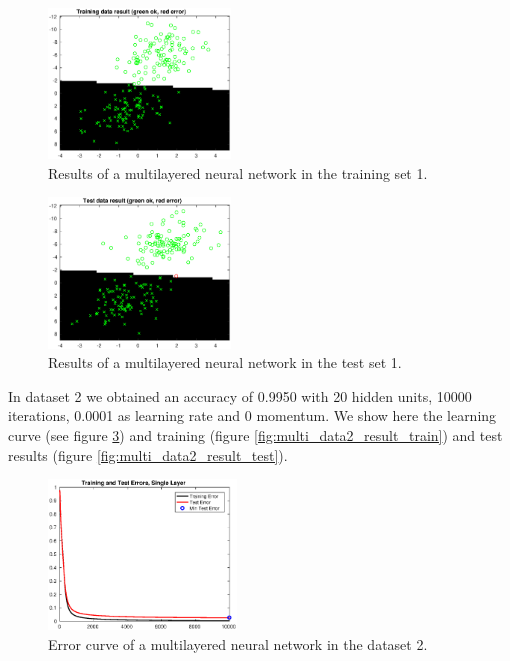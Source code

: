 \documentclass{article}
\begin{document}
\begin{figure}[!htb]
\centering
\includegraphics[height=4cm]{images/multi_data1_result_train}
\caption{Results of a multilayered neural network in the training set 1.}
\label{fig:multi_data1_result_train}
\end{figure}

\begin{figure}[!htb]
\centering
\includegraphics[height=4cm]{images/multi_data1_result_test}
\caption{Results of a multilayered neural network in the test set 1.}
\label{fig:multi_data1_result_test}
\end{figure}


In dataset 2 we obtained an accuracy of 0.9950 with 20 hidden units, 10000 iterations, 0.0001 as learning rate and 0 momentum. We show here the learning curve (see figure \ref{fig:multi_data2_error}) and training (figure \ref{fig:multi_data2_result_train}) and test results (figure \ref{fig:multi_data2_result_test}).

\begin{figure}[!htb]
\centering
\includegraphics[height=4cm]{images/multi_data2_error}
\caption{Error curve of a multilayered neural network in the dataset 2.}
\label{fig:multi_data2_error}
\end{figure}
\end{document}
